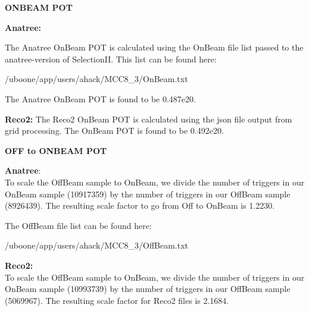 \documentclass{article}
\begin{document}
\noindent \textbf{ONBEAM POT} 

\noindent \textbf{Anatree:} 

The Anatree OnBeam POT is calculated using the OnBeam file list passed to the anatree-version of SelectionII. This list can be found here: 
\par /uboone/app/users/ahack/MCC8\_3/OnBeam.txt 

\noindent The Anatree OnBeam POT is found to be 0.487e20.

\noindent \textbf{Reco2:} The Reco2 OnBeam POT is calculated using the json file output from grid processing. The OnBeam POT is found to be 0.492e20.

\noindent \textbf{OFF to ONBEAM POT} 

\noindent \textbf{Anatree}: \\
To scale the OffBeam sample to OnBeam, we divide the number of triggers in our OnBeam sample (10917359) by the number of triggers in our OffBeam sample (8926439). The resulting scale factor to go from Off to OnBeam is 1.2230.

The OffBeam file list can be found here: 
\par /uboone/app/users/ahack/MCC8\_3/OffBeam.txt 




\noindent \textbf{Reco2:}\\
To scale the OffBeam sample to OnBeam, we divide the number of triggers in our OnBeam sample (10993739) by the number of triggers in our OffBeam sample (5069967). The resulting scale factor for Reco2 files is 2.1684.
\end{document}
